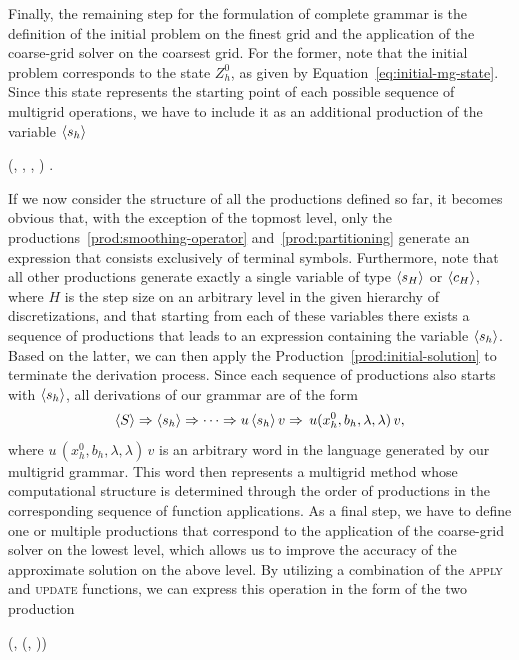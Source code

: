 Finally, the remaining step for the formulation of complete grammar is the definition of the initial problem on the finest grid and the application of the coarse-grid solver on the coarsest grid.
For the former, note that the initial problem corresponds to the state $Z_h^0$, as given by Equation~\eqref{eq:initial-mg-state}.
Since this state represents the starting point of each possible sequence of multigrid operations, we have to include it as an additional production of the variable $\langle s_h \rangle$
\begin{bnf}
	 {
	 (, , \bnfes, \bnfes)
	}.
\label{prod:initial-solution}
\end{bnf} 
If we now consider the structure of all the productions defined so far, it becomes obvious that, with the exception of the topmost level, only the productions~\eqref{prod:smoothing-operator} and~\eqref{prod:partitioning} generate an expression that consists exclusively of terminal symbols.
Furthermore, note that all other productions generate exactly a single variable of type $\langle s_H \rangle$ or $\langle c_H \rangle$, where $H$ is the step size on an arbitrary level in the given hierarchy of discretizations, and that starting from each of these variables there exists a sequence of productions that leads to an expression containing the variable $\langle s_h \rangle$.
Based on the latter, we can then apply the Production~\eqref{prod:initial-solution} to terminate the derivation process.
Since each sequence of productions also starts with $\langle s_h \rangle$, all derivations of our grammar are of the form
\begin{equation*}
	\langle S \rangle \Rightarrow \langle s_h \rangle \Rightarrow \dots \Rightarrow u \, \langle s_h \rangle \, v \Rightarrow \, u (x_h^0, b_h, \lambda, \lambda) \, v,
\end{equation*}
where $u  \, (x_h^0, b_h, \lambda, \lambda) \, v$ is an arbitrary word in the language generated by our multigrid grammar.
This word then represents a multigrid method whose computational structure is determined through the order of productions in the corresponding sequence of function applications.
As a final step, we have to define one or multiple productions that correspond to the application of the coarse-grid solver on the lowest level, which allows us to improve the accuracy of the approximate solution on the above level.
By utilizing a combination of the \textsc{apply} and \textsc{update} functions, we can express this operation in the form of the two production
\begin{bnf}
	 {
		(, \bnfsp {}(, \bnfsp{}))
	} 	\label{prod:coarse-grid-solver} \\
	 	\label{prod:coarse-grid-solver-correction}
\end{bnf}
